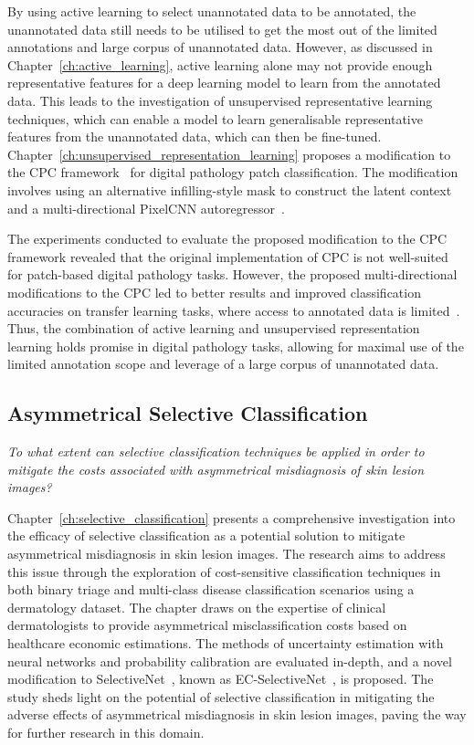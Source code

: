 By using active learning to select unannotated data to be annotated, the unannotated data still needs to be utilised to get the most out of the limited annotations and large corpus of unannotated data. However, as discussed in Chapter~\ref{ch:active_learning}, active learning alone may not provide enough representative features for a deep learning model to learn from the annotated data. This leads to the investigation of unsupervised representative learning techniques, which can enable a model to learn generalisable representative features from the unannotated data, which can then be fine-tuned. Chapter~\ref{ch:unsupervised_representation_learning} proposes a modification to the CPC framework~\citep{oord2018representation} for digital pathology patch classification. The modification involves using an alternative infilling-style mask to construct the latent context and a multi-directional PixelCNN autoregressor~\citep{oord2016pixel}.

The experiments conducted to evaluate the proposed modification to the CPC framework revealed that the original implementation of CPC is not well-suited for patch-based digital pathology tasks. However, the proposed multi-directional modifications to the CPC led to better results and improved classification accuracies on transfer learning tasks, where access to annotated data is limited~\citep{carse2021unsupervised}. Thus, the combination of active learning and unsupervised representation learning holds promise in digital pathology tasks, allowing for maximal use of the limited annotation scope and leverage of a large corpus of unannotated data.

\newpage
\subsection{Asymmetrical Selective Classification}
\textit{To what extent can selective classification techniques be applied in order to mitigate the costs associated with asymmetrical misdiagnosis of skin lesion images?}

Chapter~\ref{ch:selective_classification} presents a comprehensive investigation into the efficacy of selective classification as a potential solution to mitigate asymmetrical misdiagnosis in skin lesion images. The research aims to address this issue through the exploration of cost-sensitive classification techniques in both binary triage and multi-class disease classification scenarios using a dermatology dataset. The chapter draws on the expertise of clinical dermatologists to provide asymmetrical misclassification costs based on healthcare economic estimations. The methods of uncertainty estimation with neural networks and probability calibration are evaluated in-depth, and a novel modification to SelectiveNet~\citep{geifman2019selectivenet}, known as EC-SelectiveNet~\citep{carse2021robust}, is proposed. The study sheds light on the potential of selective classification in mitigating the adverse effects of asymmetrical misdiagnosis in skin lesion images, paving the way for further research in this domain.

